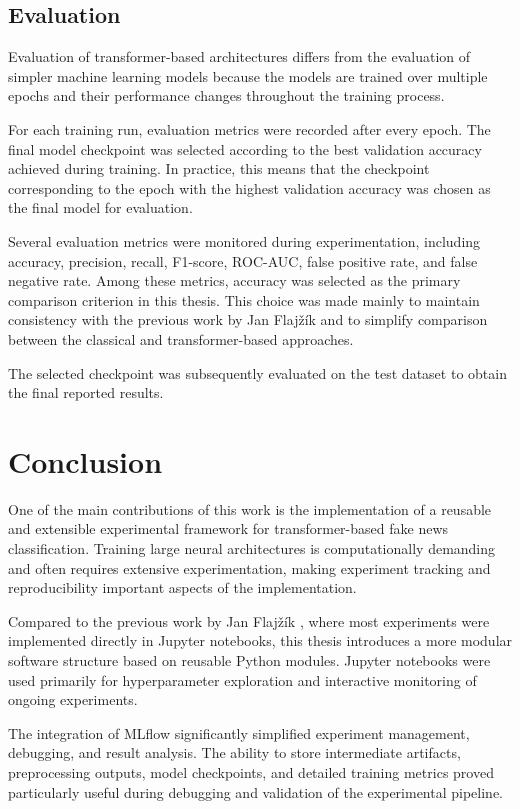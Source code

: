 \subsection{Evaluation}

\begin{markdown}

Evaluation of transformer-based architectures differs from the evaluation of simpler machine learning models because the models are trained over multiple epochs and their performance changes throughout the training process.

For each training run, evaluation metrics were recorded after every epoch. The final model checkpoint was selected according to the best validation accuracy achieved during training. In practice, this means that the checkpoint corresponding to the epoch with the highest validation accuracy was chosen as the final model for evaluation.

Several evaluation metrics were monitored during experimentation, including accuracy, precision, recall, F1-score, ROC-AUC, false positive rate, and false negative rate. Among these metrics, accuracy was selected as the primary comparison criterion in this thesis. This choice was made mainly to maintain consistency with the previous work by Jan Flajžík \cite{flajzik_classification_2024} and to simplify comparison between the classical and transformer-based approaches.

The selected checkpoint was subsequently evaluated on the test dataset to obtain the final reported results.

\end{markdown}

\section{Conclusion}

\begin{markdown}

One of the main contributions of this work is the implementation of a reusable and extensible experimental framework for transformer-based fake news classification. Training large neural architectures is computationally demanding and often requires extensive experimentation, making experiment tracking and reproducibility important aspects of the implementation.

Compared to the previous work by Jan Flajžík \cite{flajzik_classification_2024}, where most experiments were implemented directly in Jupyter notebooks, this thesis introduces a more modular software structure based on reusable Python modules. Jupyter notebooks were used primarily for hyperparameter exploration and interactive monitoring of ongoing experiments.

The integration of MLflow significantly simplified experiment management, debugging, and result analysis. The ability to store intermediate artifacts, preprocessing outputs, model checkpoints, and detailed training metrics proved particularly useful during debugging and validation of the experimental pipeline.

\end{markdown}